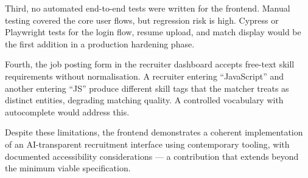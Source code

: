 Third, no automated end-to-end tests were written for the frontend. Manual testing covered the core user flows, but regression risk is high. Cypress or Playwright tests for the login flow, resume upload, and match display would be the first addition in a production hardening phase.

Fourth, the job posting form in the recruiter dashboard accepts free-text skill requirements without normalisation. A recruiter entering ``JavaScript'' and another entering ``JS'' produce different skill tags that the matcher treats as distinct entities, degrading matching quality. A controlled vocabulary with autocomplete would address this.

Despite these limitations, the frontend demonstrates a coherent implementation of an AI-transparent recruitment interface using contemporary tooling, with documented accessibility considerations --- a contribution that extends beyond the minimum viable specification.
